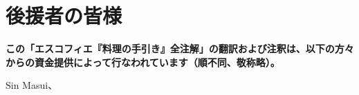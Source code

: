 \hypertarget{benefactors}{%
\section{後援者の皆様}\label{benefactors}}

\thispagestyle{empty}

\textbf{この「エスコフィエ『料理の手引き』全注解」の翻訳および注釈は、以下の方々からの資金提供によって行なわれています（順不同、敬称略）。}

Sin Masui、\href{20180524-23h,2x5000}{}
